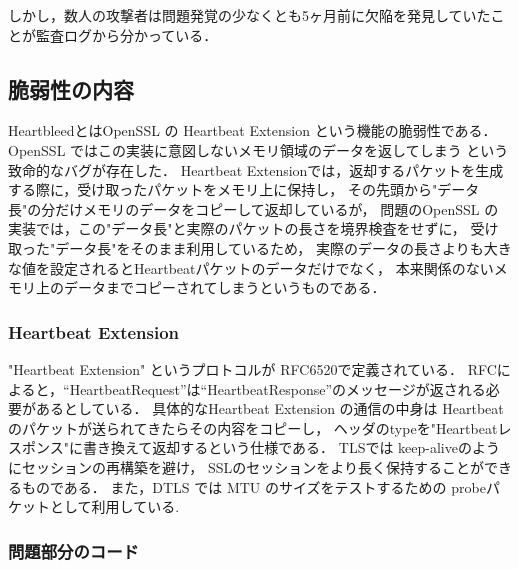しかし，数人の攻撃者は問題発覚の少なくとも5ヶ月前に欠陥を発見していたことが監査ログから分かっている\cite{ars}\cite{erratasecurity}．


\subsection{脆弱性の内容}
HeartbleedとはOpenSSL の Heartbeat Extension という機能の脆弱性である．
OpenSSL ではこの実装に意図しないメモリ領域のデータを返してしまう という致命的なバグが存在した．
Heartbeat Extensionでは，返却するパケットを生成する際に，受け取ったパケットをメモリ上に保持し，
その先頭から"データ長"の分だけメモリのデータをコピーして返却しているが，
問題のOpenSSL の実装では，この"データ長"と実際のパケットの長さを境界検査をせずに，
受け取った"データ長"をそのまま利用しているため，
実際のデータの長さよりも大きな値を設定されるとHeartbeatパケットのデータだけでなく，
本来関係のないメモリ上のデータまでコピーされてしまうというものである．


\subsubsection{Heartbeat Extension}
"Heartbeat Extension" というプロトコルが RFC6520\cite{rfc6520}で定義されている．
RFCによると，``HeartbeatRequest''は``HeartbeatResponse''のメッセージが返される必要があるとしている．
具体的なHeartbeat Extension の通信の中身は Heartbeat のパケットが送られてきたらその内容をコピーし，
ヘッダのtypeを"Heartbeatレスポンス"に書き換えて返却するという仕様である．
TLSでは keep-aliveのようにセッションの再構築を避け，
SSLのセッションをより長く保持することができるものである．
また，DTLS では MTU のサイズをテストするための probeパケットとして利用している.


\subsubsection{問題部分のコード}

